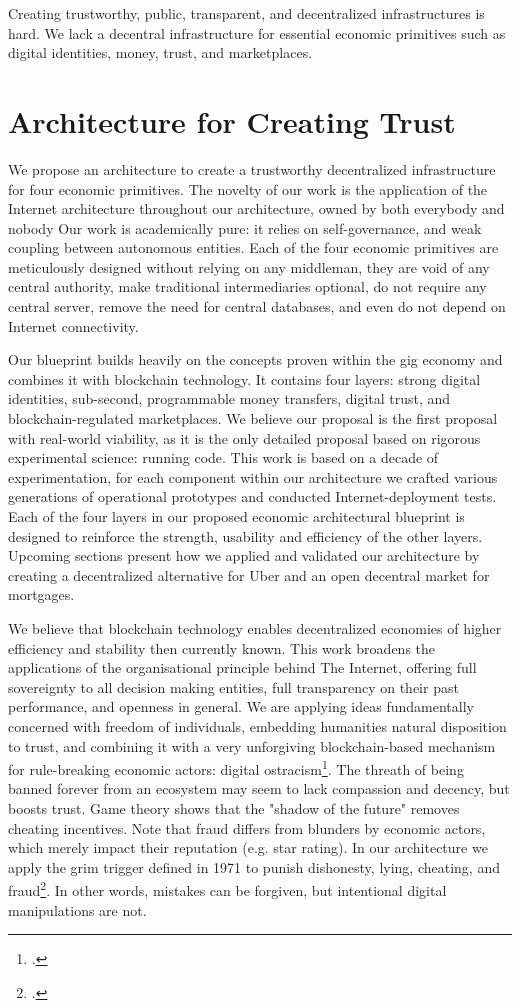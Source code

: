 \documentclass[USenglish]{article}
\begin{document}
Creating trustworthy, public, transparent, and decentralized infrastructures is hard.
We lack a decentral infrastructure for essential economic primitives such as digital identities, money, trust, and marketplaces. 

\section{Architecture for Creating Trust}

We propose an architecture to create a trustworthy decentralized infrastructure for four economic primitives.
The novelty of our work is the application of the Internet architecture throughout our architecture, owned by both everybody and nobody
Our work is academically pure: it relies on self-governance, and weak coupling between autonomous entities. 
Each of the four economic primitives are meticulously designed without relying on any middleman, they are void of any central authority, make traditional intermediaries optional, do not require any central server, remove the need for central databases, and even do not depend on Internet connectivity.

Our blueprint builds heavily on the concepts proven within the gig economy and combines it with blockchain technology.
It contains four layers: strong digital identities, sub-second, programmable money transfers, digital trust, and blockchain-regulated marketplaces.
We believe our proposal is the first proposal with real-world viability, as it is the only detailed proposal based on rigorous experimental science: running code.
This work is based on a decade of experimentation, for each component within our architecture we crafted various generations of operational prototypes and conducted Internet-deployment tests.
Each of the four layers in our proposed economic architectural blueprint is designed to reinforce the strength, usability and efficiency of the other layers. 
Upcoming sections present how we applied and validated our architecture by creating a decentralized alternative for Uber and an open decentral market for mortgages.

We believe that blockchain technology enables decentralized economies of higher efficiency and stability then currently known. 
This work broadens the applications of the organisational principle behind The Internet, offering full sovereignty to all decision making entities, full transparency on their past performance, and openness in general.
We are applying ideas fundamentally concerned with freedom of individuals, embedding humanities natural disposition to trust, and combining it with a very unforgiving blockchain-based mechanism for rule-breaking economic actors: digital ostracism\footcite{bicchieri2004trust}. 
The threath of being banned forever from an ecosystem may seem to lack compassion and decency, but boosts trust. 
Game theory shows that the "shadow of the future" removes cheating incentives.
Note that fraud differs from blunders by economic actors, which merely impact their reputation (e.g. star rating).
In our architecture we apply the grim trigger defined in 1971 to punish dishonesty, lying, cheating, and fraud\footcite{friedman1971non}.
In other words, mistakes can be forgiven, but intentional digital manipulations are not.
\end{document}

